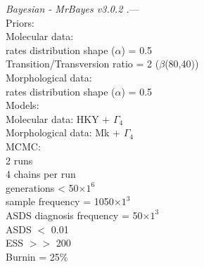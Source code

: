\documentclass[12pt,letterpaper]{article}
\renewcommand{\subsubsection}[1]{%
\vspace{2ex}
\noindent
\textit{#1.}---}
\begin{document}
\subsubsection{Bayesian - MrBayes v3.0.2 \citep{Ronquist2012mrbayes}} \\
Priors: \\
Molecular data: \\
rates distribution shape ($\alpha$) = 0.5 \\
Transition/Transversion ratio = 2 ($\beta$(80,40)) \\
Morphological data: \\
rates distribution shape ($\alpha$) = 0.5 \\
Models: \\
Molecular data: HKY + $\Gamma_4$ \\
Morphological data: Mk + $\Gamma_4$ \\
MCMC: \\
2 runs \\
4 chains per run \\
generations < 50$\times$$1^6$ \\
sample frequency = 1050$\times$$1^3$ \\
ASDS diagnosis frequency = 50$\times$$1^3$ \\
ASDS $<$ 0.01 \\
ESS $>>$ 200 \\
Burnin = 25\%
\end{document}
